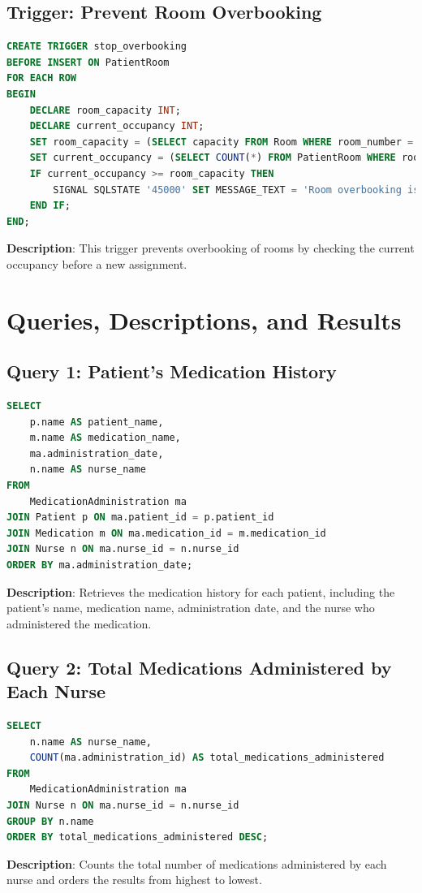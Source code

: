 \documentclass{article}
\begin{document}
\subsection{Trigger: Prevent Room Overbooking}
\begin{lstlisting}[language=SQL]
CREATE TRIGGER stop_overbooking
BEFORE INSERT ON PatientRoom
FOR EACH ROW
BEGIN
    DECLARE room_capacity INT;
    DECLARE current_occupancy INT;
    SET room_capacity = (SELECT capacity FROM Room WHERE room_number = NEW.room_number);
    SET current_occupancy = (SELECT COUNT(*) FROM PatientRoom WHERE room_number = NEW.room_number AND check_out_date IS NULL);
    IF current_occupancy >= room_capacity THEN
        SIGNAL SQLSTATE '45000' SET MESSAGE_TEXT = 'Room overbooking is not allowed';
    END IF;
END;
\end{lstlisting}
\textbf{Description}: This trigger prevents overbooking of rooms by checking the current occupancy before a new assignment.

\section{Queries, Descriptions, and Results}
\subsection{Query 1: Patient's Medication History}
\begin{lstlisting}[language=SQL]
SELECT 
    p.name AS patient_name,
    m.name AS medication_name,
    ma.administration_date,
    n.name AS nurse_name
FROM 
    MedicationAdministration ma
JOIN Patient p ON ma.patient_id = p.patient_id
JOIN Medication m ON ma.medication_id = m.medication_id
JOIN Nurse n ON ma.nurse_id = n.nurse_id
ORDER BY ma.administration_date;
\end{lstlisting}
\textbf{Description}: Retrieves the medication history for each patient, including the patient's name, medication name, administration date, and the nurse who administered the medication.

\subsection{Query 2: Total Medications Administered by Each Nurse}
\begin{lstlisting}[language=SQL]
SELECT 
    n.name AS nurse_name,
    COUNT(ma.administration_id) AS total_medications_administered
FROM 
    MedicationAdministration ma
JOIN Nurse n ON ma.nurse_id = n.nurse_id
GROUP BY n.name
ORDER BY total_medications_administered DESC;
\end{lstlisting}
\textbf{Description}: Counts the total number of medications administered by each nurse and orders the results from highest to lowest.
\end{document}
